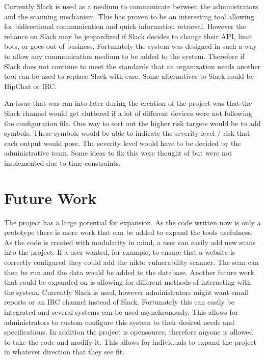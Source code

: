 \documentclass[12pt]{article}
\begin{document}
Currently Slack is used as a medium to communicate between the administrators and the scanning mechanism. This has proven to be an interesting tool allowing for bidirectional communication and quick information retrieval. However the reliance on Slack may be jeopardized if Slack decides to change their API, limit bots, or goes out of business. Fortunately the system was designed in such a way to allow any communication medium to be added to the system. Therefore if Slack does not continue to meet the standards that an organization needs another tool can be used to replace Slack with ease. Some alternatives to Slack could be HipChat or IRC.

An issue that was ran into later during the creation of the project was that the Slack channel would get cluttered if a lot of different devices were not following the configuration file. One way to sort out the higher risk targets would be to add symbols. These symbols would be able to indicate the severity level / risk that each output would pose. The severity level would have to be decided by the administrative team. Some ideas to fix this were thought of but were not implemented due to time constraints.

\section{Future Work}
The project has a large potential for expansion. As the code written now is only a prototype there is more work that can be added to expand the tools usefulness. As the code is created with modularity in mind, a user can easily add new scans into the project. If a user wanted, for example, to ensure that a website is correctly configured they could add the nikto \cite{NiktoScan} vulnerability scanner. The scan can then be run and the data would be added to the database. Another future work that could be expanded on is allowing for different methods of interacting with the system. Currently Slack is used, however administrators might want email reports or an IRC channel instead of Slack. Fortunately this can easily be integrated and several systems can be used asynchronously. This allows for administrators to custom configure this system to their desired needs and specifications. In addition the project is opensource, therefore anyone is allowed to take the code and modify it. This allows for individuals to expand the project in whatever direction that they see fit.
\end{document}
